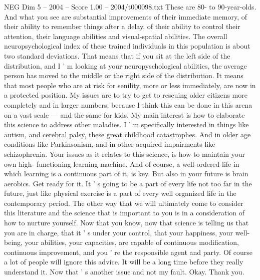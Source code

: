 \begin{textsample}{NEG Dim 5 – 2004 – Score 1.00 – 2004/t000098.txt}
These are 80- to 90-year-olds.
And what you see are substantial improvements of their immediate memory, of their ability to remember things after a delay, of their ability to control their attention, their language abilities and visual-spatial abilities.
The overall neuropsychological index of these trained individuals in this population is about two standard deviations.
That means that if you sit at the left side of the distribution, and I ' m looking at your neuropyschological abilities, the average person has moved to the middle or the right side of the distribution.
It means that most people who are at risk for senility, more or less immediately, are now in a protected position.
My issues are to try to get to rescuing older citizens more completely and in larger numbers, because I think this can be done in this arena on a vast scale — and the same for kids.
My main interest is how to elaborate this science to address other maladies.
I ' m specifically interested in things like autism, and cerebral palsy, these great childhood catastrophes.
And in older age conditions like Parkinsonism, and in other acquired impairments like schizophrenia.
Your issues as it relates to this science, is how to maintain your own high- functioning learning machine.
And of course, a well-ordered life in which learning is a continuous part of it, is key.
But also in your future is brain aerobics.
Get ready for it.
It ' s going to be a part of every life not too far in the future, just like physical exercise is a part of every well organized life in the contemporary period.
The other way that we will ultimately come to consider this literature and the science that is important to you is in a consideration of how to nurture yourself.
Now that you know, now that science is telling us that you are in charge, that it ' s under your control, that your happiness, your well-being, your abilities, your capacities, are capable of continuous modification, continuous improvement, and you ' re the responsible agent and party.
Of course a lot of people will ignore this advice.
It will be a long time before they really understand it.
Now that ' s another issue and not my fault.
Okay.
Thank you.

\end{textsample}
